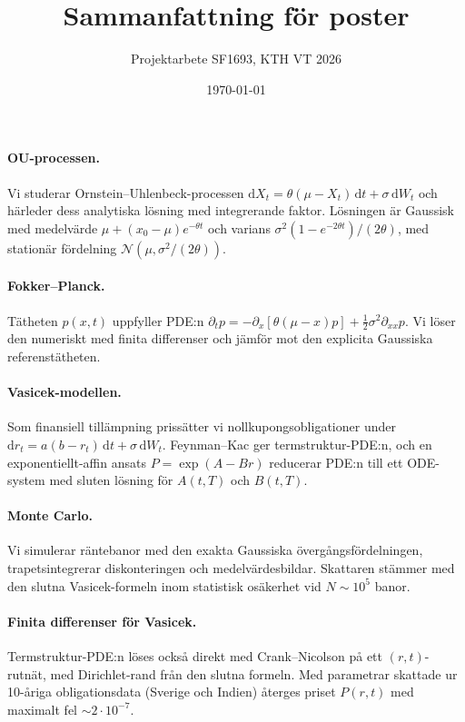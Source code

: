 \documentclass[11pt,a4paper]{article}
\title{Sammanfattning för poster}
\author{Projektarbete SF1693, KTH VT 2026}
\date{\today}
\newcommand{\dd}{\mathrm{d}}
\begin{document}
\maketitle

\paragraph{OU-processen.}
Vi studerar Ornstein--Uhlenbeck-processen
$\dd X_t = \theta(\mu - X_t)\,\dd t + \sigma\,\dd W_t$ och härleder
dess analytiska lösning med integrerande faktor. Lösningen är
Gaussisk med medelvärde $\mu + (x_0-\mu)e^{-\theta t}$ och varians
$\sigma^2(1-e^{-2\theta t})/(2\theta)$, med stationär fördelning
$\mathcal{N}(\mu, \sigma^2/(2\theta))$.

\paragraph{Fokker--Planck.}
Tätheten $p(x,t)$ uppfyller PDE:n
$\partial_t p = -\partial_x[\theta(\mu-x)p] + \tfrac{1}{2}\sigma^2 \partial_{xx} p$.
Vi löser den numeriskt med finita differenser och jämför mot den
explicita Gaussiska referenstätheten.

\paragraph{Vasicek-modellen.}
Som finansiell tillämpning prissätter vi nollkupongsobligationer
under $\dd r_t = a(b-r_t)\,\dd t + \sigma\,\dd W_t$. Feynman--Kac
ger termstruktur-PDE:n, och en exponentiellt-affin ansats
$P = \exp(A - Br)$ reducerar PDE:n till ett ODE-system med sluten
lösning för $A(t,T)$ och $B(t,T)$.

\paragraph{Monte Carlo.}
Vi simulerar räntebanor med den exakta Gaussiska övergångsfördelningen,
trapetsintegrerar diskonteringen och medelvärdesbildar. Skattaren
stämmer med den slutna Vasicek-formeln inom statistisk osäkerhet vid
$N\sim 10^5$ banor.

\paragraph{Finita differenser för Vasicek.}
Termstruktur-PDE:n löses också direkt med Crank--Nicolson på ett
$(r,t)$-rutnät, med Dirichlet-rand från den slutna formeln. Med
parametrar skattade ur 10-åriga obligationsdata (Sverige och Indien)
återges priset $P(r,t)$ med maximalt fel $\sim 2\cdot 10^{-7}$.
\end{document}
